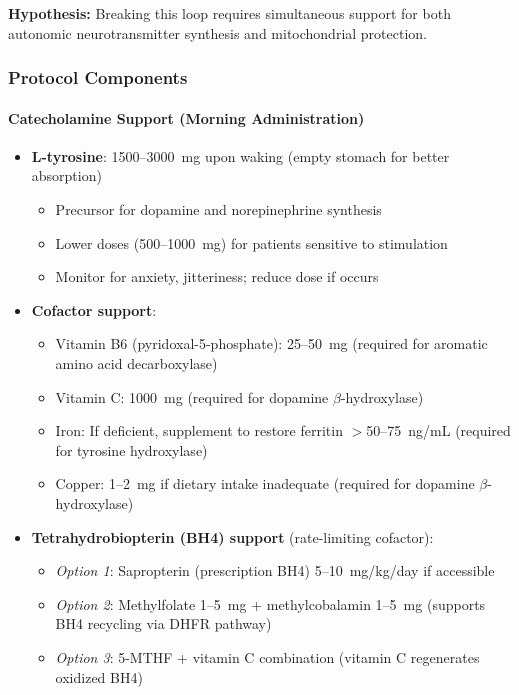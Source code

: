 \textbf{Hypothesis:} Breaking this loop requires simultaneous support for both autonomic neurotransmitter synthesis and mitochondrial protection.

\subsubsection{Protocol Components}

\paragraph{Catecholamine Support (Morning Administration)}

\begin{itemize}
    \item \textbf{L-tyrosine}: 1500--3000~mg upon waking (empty stomach for better absorption)
    \begin{itemize}
        \item Precursor for dopamine and norepinephrine synthesis
        \item Lower doses (500--1000~mg) for patients sensitive to stimulation
        \item Monitor for anxiety, jitteriness; reduce dose if occurs
    \end{itemize}

    \item \textbf{Cofactor support}:
    \begin{itemize}
        \item Vitamin B6 (pyridoxal-5-phosphate): 25--50~mg (required for aromatic amino acid decarboxylase)
        \item Vitamin C: 1000~mg (required for dopamine $\beta$-hydroxylase)
        \item Iron: If deficient, supplement to restore ferritin $>$50--75~ng/mL (required for tyrosine hydroxylase)
        \item Copper: 1--2~mg if dietary intake inadequate (required for dopamine $\beta$-hydroxylase)
    \end{itemize}

    \item \textbf{Tetrahydrobiopterin (BH4) support} (rate-limiting cofactor):
    \begin{itemize}
        \item \textit{Option 1}: Sapropterin (prescription BH4) 5--10~mg/kg/day if accessible
        \item \textit{Option 2}: Methylfolate 1--5~mg + methylcobalamin 1--5~mg (supports BH4 recycling via DHFR pathway)
        \item \textit{Option 3}: 5-MTHF + vitamin C combination (vitamin C regenerates oxidized BH4)
    \end{itemize}
\end{itemize}


